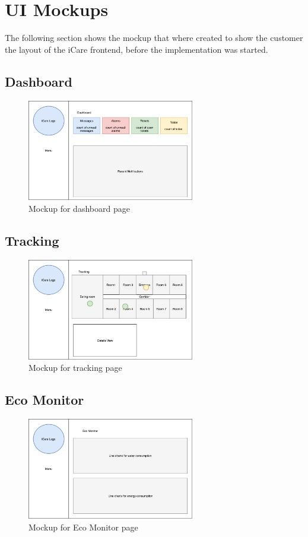 \section{UI Mockups}

The following section shows the mockup that where created to show the customer the 
layout of the iCare frontend, before the implementation was started.

\subsection{Dashboard}
\begin{figure}[H]
	\centering
	\includegraphics[width =0.65\textwidth]{images/mockDashboard.png}
	\caption{Mockup for dashboard page}
\end{figure}

\subsection{Tracking}
\begin{figure}[H]
	\centering
	\includegraphics[width =0.65\textwidth]{images/mockTracking.png}
	\caption{Mockup for tracking page}
\end{figure}


\subsection{Eco Monitor}
\begin{figure}[H]
	\centering
	\includegraphics[width =0.65\textwidth]{images/mockEcoMonitor.png}
	\caption{Mockup for Eco Monitor page}
\end{figure}



